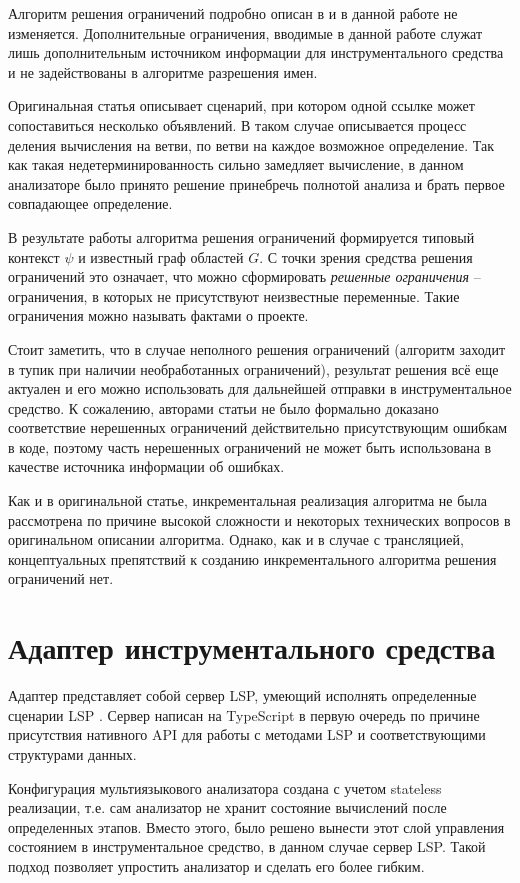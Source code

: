 Алгоритм решения ограничений подробно описан в \cite{scope-graphs-static-analysis} и в данной работе не изменяется.
Дополнительные ограничения, вводимые в данной работе служат лишь дополнительным источником информации для
инструментального средства и не задействованы в алгоритме разрешения имен.

Оригинальная статья описывает сценарий, при котором одной ссылке может сопоставиться несколько объявлений.
В таком случае описывается процесс деления вычисления на ветви, по ветви на каждое возможное определение.
Так как такая недетерминированность сильно замедляет вычисление, в данном анализаторе было принято решение
принебречь полнотой анализа и брать первое совпадающее определение.

В результате работы алгоритма решения ограничений формируется типовый контекст $\psi$ и известный граф областей
$G$. С точки зрения средства решения ограничений это означает, что можно сформировать \textit{решенные ограничения} -- ограничения,
в которых не присутствуют неизвестные переменные. Такие ограничения можно называть фактами о проекте.

Стоит заметить, что в случае неполного решения ограничений (алгоритм заходит в тупик при наличии необработанных ограничений),
результат решения всё еще актуален и его можно использовать для дальнейшей отправки в инструментальное средство.
К сожалению, авторами статьи не было формально доказано соответствие нерешенных ограничений действительно присутствующим
ошибкам в коде, поэтому часть нерешенных ограничений не может быть использована в качестве источника информации об ошибках.

Как и в оригинальной статье, инкрементальная реализация алгоритма не была рассмотрена по причине высокой сложности
и некоторых технических вопросов в оригинальном описании алгоритма. Однако, как и в случае с трансляцией,
концептуальных препятствий к созданию инкрементального алгоритма решения ограничений нет.

\section{Адаптер инструментального средства}

Адаптер представляет собой сервер LSP, умеющий исполнять определенные сценарии LSP \cite{lsp-usecases}.
Сервер написан на TypeScript в первую очередь по причине присутствия нативного API для
работы с методами LSP и соответствующими структурами данных.

Конфигурация мультиязыкового анализатора создана с учетом stateless реализации, т.е. сам анализатор не хранит
состояние вычислений после определенных этапов. Вместо этого, было решено вынести этот слой управления состоянием
в инструментальное средство, в данном случае сервер LSP. Такой подход позволяет упростить анализатор и сделать его более гибким.

